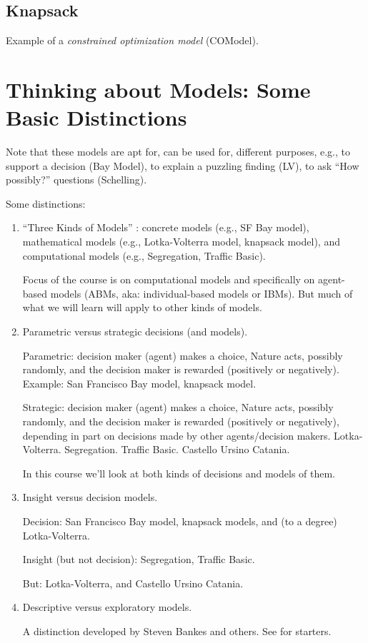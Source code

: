 \subsection{Knapsack}

Example of a \emph{constrained optimization model} (COModel).

\clearpage\newpage

\section{Thinking about Models: Some Basic Distinctions}


Note that these models are apt for, can be used for, different
purposes, e.g.,  to
  support a decision (Bay Model), to explain a puzzling finding (LV), to
  ask ``How possibly?'' questions (Schelling).

Some distinctions:
\begin{enumerate}
\item ``Three Kinds of Models'' \citep[chapter 2]{weisberg_2013}:
  concrete models (e.g., SF Bay model), mathematical models (e.g.,
  Lotka-Volterra model, knapsack model), and computational models
  (e.g., Segregation, Traffic Basic).

Focus of the course is on computational models and specifically on
agent-based models (ABMs, aka: individual-based models or IBMs).
But much of what we will learn will apply to other kinds of models.

\item Parametric versus strategic decisions (and models).

Parametric: decision maker (agent) makes a choice, Nature acts, possibly
randomly, and the decision maker is rewarded (positively or
negatively). Example: San Francisco Bay model, knapsack model.

Strategic: decision maker (agent) makes a choice, Nature acts, possibly
randomly, and the decision maker is rewarded (positively or
negatively), depending in part on decisions made by other
agents/decision makers. Lotka-Volterra. Segregation. Traffic Basic. Castello Ursino Catania.

In this course we'll look at both kinds of decisions and models of them.

\item Insight versus decision models.

Decision: San Francisco Bay model, knapsack models, and (to a degree) Lotka-Volterra.

Insight (but not decision): Segregation, Traffic Basic. 


But: Lotka-Volterra, and Castello Ursino Catania.

\item Descriptive versus exploratory models.

A distinction developed by Steven Bankes and others. See \citep{bankes_1993,bankes_lempert_popper_2002} for starters.

\end{enumerate}


